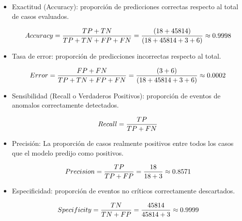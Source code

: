 \begin{itemize}
      \item  Exactitud (Accuracy): proporción de predicciones correctas respecto al total de casos evaluados.

            \begin{align}
                  Accuracy = \frac{TP+TN}{TP+TN+FP+FN}=\frac{(18+45814)}{(18+45814+3+6)}\approx 0.9998 \notag \\
                  \label{eq:accuracy}
            \end{align}


      \item Tasa de error: proporción de predicciones incorrectas respecto al total.

            \begin{align}
                  Error = \frac{FP+FN}{TP+TN+FP+FN}=\frac{(3+6)}{(18+45814+3+6)}\approx 0.0002 \notag \\
                  \label{eq:error}
            \end{align}

      \item Sensibilidad (Recall o Verdaderos Positivos): proporción de eventos de anomalos correctamente detectados.

            \begin{align}
                  Recall = \frac{TP}{TP+FN} \notag \\
                  \label{eq:recall}
            \end{align}

      \item Precisión: La proporción de casos realmente positivos entre todos los casos que el modelo predijo como positivos.

            \begin{align}
                  Precision = \frac{TP}{TP+FP}=\frac{18}{18+3}\approx 0.8571 \notag \\
                  \label{eq:precision}
            \end{align}

      \item Especificidad: proporción de eventos no críticos correctamente descartados.

            \begin{align}
                  Specificity = \frac{TN}{TN+FP}=\frac{45814}{45814+3}\approx 0.9999 \notag \\
                  \label{eq:specificity}
            \end{align}


\end{itemize}
